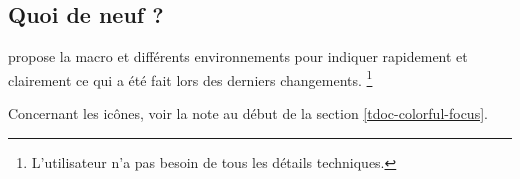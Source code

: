 \documentclass[10pt, a4paper]{article}
\begin{document}
\subsection{Quoi de neuf ?} 

\thispack{} propose la macro  et différents environnements pour indiquer rapidement et clairement ce qui a été fait lors des derniers changements.%
\footnote{
    L'utilisateur n'a pas besoin de tous les détails techniques.
}


\begin{tdocnote}
    Concernant les icônes, voir la note au début de la section \ref{tdoc-colorful-focus}.
\end{tdocnote}




\begin{tdocexa}
    \leavevmode

\end{tdocexa}




\begin{tdocexa}
    \leavevmode

\end{tdocexa}




\begin{tdocexa}
    \leavevmode

\end{tdocexa}




\begin{tdocexa}
    \leavevmode

\end{tdocexa}




\begin{tdocexa}
    \leavevmode

\end{tdocexa}


\end{document}
